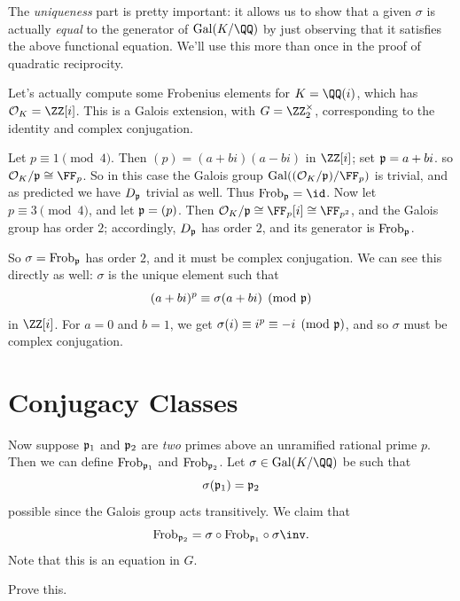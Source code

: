 The \emph{uniqueness} part is pretty important:
it allows us to show that a given $\sigma$ is actually \emph{equal}
to the generator of $\Gal(K/\QQ)$ by just observing that it satisfies
the above functional equation.
We'll use this more than once in the proof of quadratic reciprocity.

\begin{example}
	Let's actually compute some Frobenius elements for $K = \QQ(i)$,
	which has $\OO_K = \ZZ[i]$.
	This is a Galois extension, with $G = \Zm2$, corresponding to the identity
	and complex conjugation.
	\begin{enumerate}[(a)]
		\ii Let $p \equiv 1 \pmod 4$.
		Then $(p) = (a+bi)(a-bi)$ in $\ZZ[i]$; set $\mathfrak p = a + bi$.
		so $\OO_K / \pp \cong \FF_p$.
		So in this case the Galois group $\Gal( (\OO_K/\pp) / \FF_p )$
		is trivial, and as predicted we have $D_\mathfrak p$ trivial as well.
		Thus $\Frob_\pp = \id$.
		\ii Now let $p \equiv 3 \pmod 4$, and let $\mathfrak p = (p)$.
		Then $\OO_K / \pp \cong \FF_p[i] \cong \FF_{p^2}$, and the Galois group has order $2$;
		accordingly, $D_\mathfrak p$ has order $2$, and its generator is $\mathrm{Frob}_\mathfrak p$.

		So $\sigma = \mathrm{Frob}_\mathfrak p$ has order $2$, and it must be complex conjugation.
		We can see this directly as well: $\sigma$ is the unique element such that
		\[ (a+bi)^p \equiv \sigma(a+bi) \pmod{\mathfrak p} \]
		in $\ZZ[i]$.
		For $a=0$ and $b=1$, we get $\sigma(i) \equiv i^p \equiv -i \pmod{\mathfrak p}$,
		and so $\sigma$ must be complex conjugation.
	\end{enumerate}
\end{example}

\section{Conjugacy Classes}
Now suppose $\mathfrak p_1$ and $\mathfrak p_2$ are \emph{two} primes above an unramified rational prime $p$.
Then we can define $\mathrm{Frob}_{\mathfrak p_1}$ and $\mathrm{Frob}_{\mathfrak p_2}$.
Let $\sigma \in \Gal(K/\QQ)$ be such that
\[ \sigma(\mathfrak p_1) = \mathfrak p_2 \]
possible since the Galois group acts transitively.
We claim that
\[
	\Frob_{\pp_2} = \sigma \circ \Frob_{\pp_1} \circ \sigma\inv.
\]
Note that this is an equation in $G$.
\begin{ques}
	Prove this.
\end{ques}

